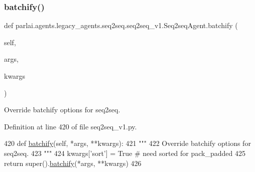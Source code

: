 \mbox{\label{classparlai_1_1agents_1_1legacy__agents_1_1seq2seq_1_1seq2seq__v1_1_1Seq2seqAgent_abb81dee41215c5d402fef970b0bf1931}} 
\subsubsection{\texorpdfstring{batchify()}{batchify()}}
{\footnotesize\ttfamily def parlai.\+agents.\+legacy\+\_\+agents.\+seq2seq.\+seq2seq\+\_\+v1.\+Seq2seq\+Agent.\+batchify (\begin{DoxyParamCaption}\item[{}]{self,  }\item[{}]{args,  }\item[{}]{kwargs }\end{DoxyParamCaption})}

\begin{DoxyVerb}Override batchify options for seq2seq.
\end{DoxyVerb}
 

Definition at line 420 of file seq2seq\+\_\+v1.\+py.


\begin{DoxyCode}
420     \textcolor{keyword}{def }\hyperlink{namespaceparlai_1_1agents_1_1drqa_1_1utils_aca22dd97c5b6dcda2a7479c1cb22ef1e}{batchify}(self, *args, **kwargs):
421         \textcolor{stringliteral}{"""}
422 \textcolor{stringliteral}{        Override batchify options for seq2seq.}
423 \textcolor{stringliteral}{        """}
424         kwargs[\textcolor{stringliteral}{'sort'}] = \textcolor{keyword}{True}  \textcolor{comment}{# need sorted for pack\_padded}
425         \textcolor{keywordflow}{return} super().\hyperlink{namespaceparlai_1_1agents_1_1drqa_1_1utils_aca22dd97c5b6dcda2a7479c1cb22ef1e}{batchify}(*args, **kwargs)
426 
\end{DoxyCode}
\mbox{\label{classparlai_1_1agents_1_1legacy__agents_1_1seq2seq_1_1seq2seq__v1_1_1Seq2seqAgent_a58227903fd44e3d436710c06457c8f84}} 
